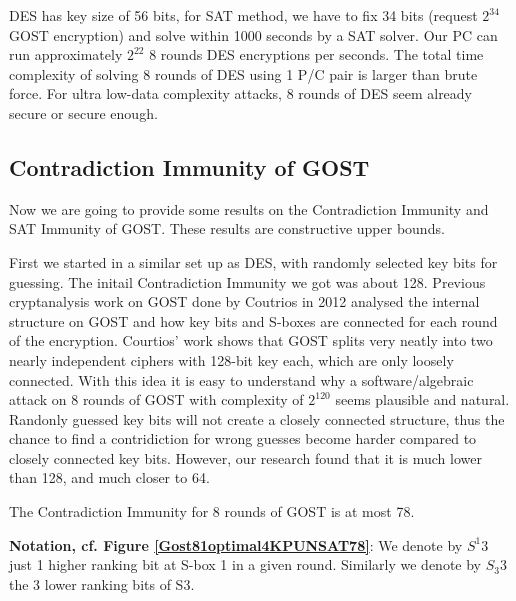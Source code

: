 DES has key size of 56 bits, for SAT method, we have to fix 34 bits (request $2^{34}$ GOST encryption) and solve within 1000 seconds by a SAT solver. Our PC can run approximately $2^{22}$ 8 rounds DES encryptions per seconds. The total time complexity of solving 8 rounds of DES using 1 P/C pair is larger than brute force. For ultra low-data complexity attacks, 8 rounds of DES seem already secure or secure enough.

\subsection{Contradiction Immunity of GOST}

Now we are going to provide some results on the Contradiction Immunity and SAT Immunity of GOST. These results are constructive upper bounds.

First we started in a similar set up as DES, with randomly selected key bits for guessing. The initail Contradiction Immunity we got was about 128. Previous cryptanalysis work on GOST done by Coutrios in 2012 \cite{gostdc2} analysed the internal structure on GOST and how key bits and S-boxes are connected for each round of the encryption. Courtios' work \cite{gostdc2} shows that GOST splits very neatly into two nearly independent ciphers with 128-bit key each, which are only loosely connected. With this idea it is easy to understand why a software/algebraic attack on 8 rounds of GOST with complexity of $2^{120}$ seems plausible and natural. Randonly guessed key bits will not create a closely connected structure, thus the chance to find a contridiction for wrong guesses become harder compared to closely connected key bits.
However, our research found that it is much lower than 128,
and much closer to 64. 
\begin{lemma}
	The Contradiction Immunity for 8 rounds of GOST is at most 78.
\end{lemma}


{\bf Notation, cf. Figure \ref{Gost81optimal4KPUNSAT78}}:
We denote by $S^{1}3$ just 1 higher ranking bit at S-box 1 in a given round.
Similarly we denote by $S_{3}3$ the 3 lower ranking bits of S3.

